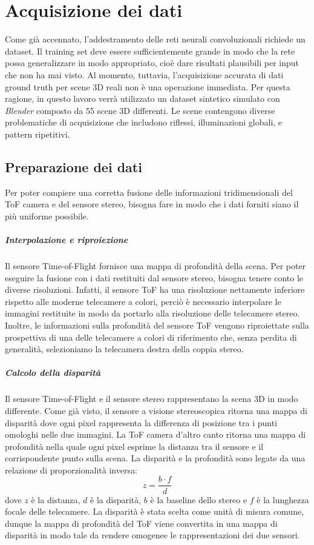 \chapter{Acquisizione dei dati}
Come già accennato, l'addestramento delle reti neurali convoluzionali richiede un dataset. Il training set deve essere sufficientemente grande in modo che la rete possa generalizzare in modo appropriato, cioè dare risultati plausibili per input che non ha mai visto. Al momento, tuttavia, l'acquisizione accurata di dati ground truth per scene 3D reali non è una operazione immediata. Per questa ragione, in questo lavoro verrà utilizzato un dataset sintetico simulato con \textit{Blender} composto da 55 scene 3D differenti. Le scene contengono diverse problematiche di acquisizione che includono riflessi, illuminazioni globali, e pattern ripetitivi. 

\section{Preparazione dei dati}
Per poter compiere una corretta fusione delle informazioni tridimensionali del ToF camera e del sensore stereo, bisogna fare in modo che i dati forniti siano il più uniforme possibile.

\paragraph{Interpolazione e riproiezione}
Il sensore Time-of-Flight fornisce una mappa di profondità della scena. Per poter eseguire la fusione con i dati restituiti dal sensore stereo, bisogna tenere conto le diverse risoluzioni. Infatti, il sensore ToF ha una risoluzione nettamente inferiore rispetto alle moderne telecamere a colori, perciò è necessario interpolare le immagini restituite in modo da portarlo alla risoluzione delle telecamere stereo.\\
Inoltre, le informazioni sulla profondità del sensore ToF vengono riproiettate sulla prospettiva di una delle telecamere a colori di riferimento che, senza perdita di generalità, selezioniamo la telecamera destra della coppia stereo. 

\paragraph{Calcolo della disparità}
Il sensore Time-of-Flight e il sensore stereo rappresentano la scena 3D in modo differente. Come già visto, il sensore a visione stereoscopica ritorna una mappa di disparità dove ogni pixel rappresenta la differenza di posizione tra i punti omologhi nelle due immagini. La ToF camera d'altro canto ritorna una mappa di profondità nella quale ogni pixel esprime la distanza tra il sensore e il corrispondente punto sulla scena. La disparità e la profondità sono legate da una relazione di proporzionalità inversa:
$$z=\frac{b\cdot f}{d}$$
dove $z$ è la distanza, $d$ è la disparità, $b$ è la baseline dello stereo e $f$ è la lunghezza focale delle telecamere. La disparità è stata scelta come unità di misura comune, dunque la mappa di profondità del ToF viene convertita in una mappa di disparità in modo tale da rendere omogenee le rappresentazioni dei due sensori.


